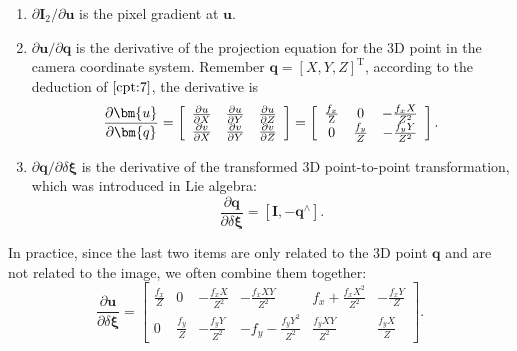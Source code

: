 \begin{enumerate}
	\item $ \partial \bm{I}_2 / \partial \bm{u} $ is the pixel gradient at $\bm{u}$.
	\item $ \partial \bm{u} / \partial \bm{q} $ is the derivative of the projection equation for the 3D point in the camera coordinate system. Remember $\bm{q}=[X,Y,Z]^\mathrm{T}$, according to the deduction of $\ref{cpt:7}$, the derivative is
	\begin{equation}
	\frac{{\partial \bm{u}}}{{\partial \bm{q}}} = \left[ {\begin{array}{*{20}{c}}
		{\frac{{\partial u}}{{\partial X}}}&{\frac{{\partial u}}{{\partial Y}}}&{\frac{{\partial u}}{{\partial Z}}}\\
		{\frac{{\partial v}}{{\partial X}}}&{\frac{{\partial v}}{{\partial Y}}}&{\frac{{\partial v}}{{\partial Z}}}
		\end{array}} \right] = \left[ {\begin{array}{*{20}{c}}
		{\frac{{{f_x}}}{{\rm{Z}}}}&0&{ - \frac{{{f_x}X}}{{{Z^2}}}}\\
		0&{\frac{{{f_y}}}{Z}}&{ - \frac{{{f_y}Y}}{{{Z^2}}}}
		\end{array}} \right].
	\end{equation}

\item ${\partial \bm{q}}/{\partial \delta \bm{\xi} }$ is the derivative of the transformed 3D point-to-point transformation, which was introduced in Lie algebra:
\begin{equation}
\frac{{\partial \bm{q}}}{{\partial \delta \bm{\xi} }} = \left[ { \bm{I}, - {\bm{q}^ \wedge }} \right].
\end{equation}
\end{enumerate}

In practice, since the last two items are only related to the 3D point $\bm{q}$ and are not related to the image, we often combine them together:
\begin{equation}
\frac{{\partial \bm{u}}}{{\partial \delta \bm{\xi} }} = \left[ {\begin{array}{*{20}{c}}
{\frac{{{f_x}}}{Z}}&0&{ - \frac{{{f_x}X}}{{{Z^2}}}}&{ - \frac{{{f_x}XY}} {{{Z^2}}}}&{{f_x} + \frac{{{f_x}{X^2}}}{{{Z^2}}}}&{ - \frac{{{f_x} Y}}{Z}}\\
	0&{\frac{{{f_y}}}{Z}}&{ - \frac{{{f_y}Y}}{{{Z^2}}}}&{ - {f_y} - \frac{{{f_y}{Y^2}}}{{{Z^2}}}}&{\frac{{{f_y}XY}}{{{Z^2}}}}&{\frac{{{f_y}X}}{Z}}
	\end{array}} \right].
\end{equation}

